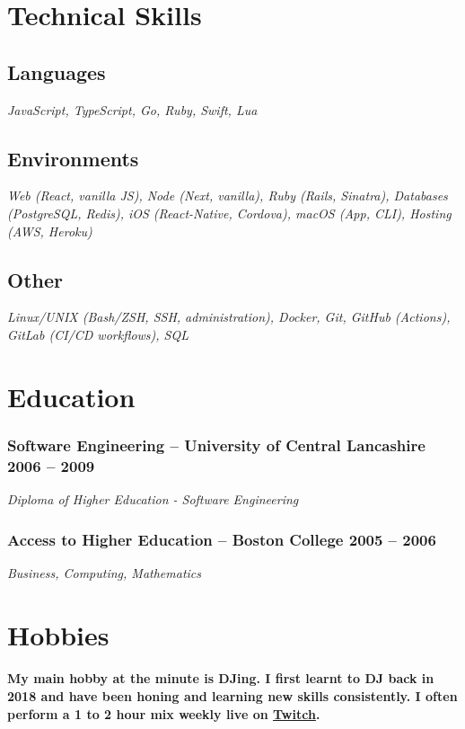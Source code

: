 \documentclass[a4paper]{article}
\newcommand{\datedsubsection}[2]{
  \subsubsection{#1 \hfill \textbf{#2}}
}
\begin{document}
\section{Technical Skills}
\subsection{Languages}
\textit{JavaScript, TypeScript, Go, Ruby, Swift, Lua}
\subsection{Environments}
\textit{Web (React, vanilla JS), Node (Next, vanilla), Ruby (Rails, Sinatra), Databases (PostgreSQL, Redis), iOS (React-Native, Cordova), macOS (App, CLI), Hosting (AWS, Heroku)}
\subsection{Other}
\textit{Linux/UNIX (Bash/ZSH, SSH, administration), Docker, Git, GitHub (Actions), GitLab (CI/CD workflows), SQL}

\section{Education}
\datedsubsection{\textbf{Software Engineering} -- University of Central Lancashire}{2006 -- 2009}
\textit{Diploma of Higher Education - Software Engineering}
\datedsubsection{\textbf{Access to Higher Education} -- Boston College}{2005 -- 2006}
\textit{Business, Computing, Mathematics}

\section{Hobbies}
\paragraph{My main hobby at the minute is DJing. I first learnt to DJ back in 2018 and have been honing and learning new skills consistently. I often perform a 1 to 2 hour mix weekly live on \href{https://twitch.tv/iamdjriff}{Twitch}.}
\end{document}
